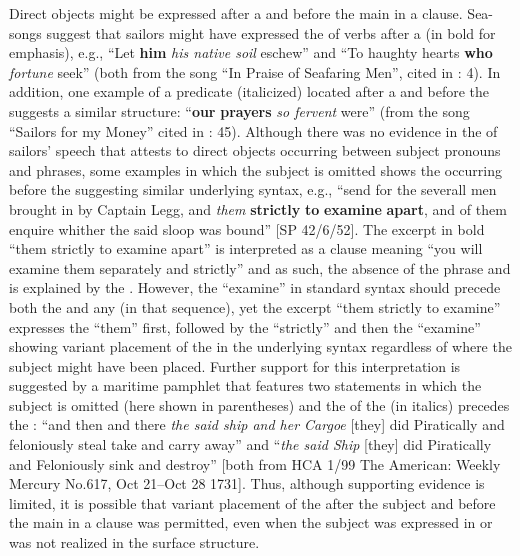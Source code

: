 Direct objects might be expressed after a  and before the main  in a clause. Sea-songs suggest that sailors might have expressed the  of  verbs after a  (in bold for emphasis), e.g., “Let \textbf{him} \textit{his native soil} eschew” and “To haughty hearts \textbf{who} \textit{fortune} seek” (both from the song “In Praise of Seafaring Men”, cited in \citealt{Palmer1986}: 4). In addition, one example of a predicate  (italicized) located after a  and before the  suggests a similar structure: “\textbf{our} \textbf{prayers} \textit{so fervent} were” (from the song “Sailors for my Money” cited in \citealt{Palmer1986}: 45). Although there was no evidence in the  of sailors’ speech that attests to direct objects occurring between subject pronouns and  phrases, some examples in which the subject is omitted shows the  occurring before the  suggesting similar underlying syntax, e.g., “send for the severall men brought in by Captain Legg, and \textit{them} \textbf{strictly} \textbf{to} \textbf{examine} \textbf{apart}, and of them enquire whither the said sloop was bound” [SP 42/6/52]. The excerpt in bold “them strictly to examine apart” is interpreted as a clause meaning “you will examine them separately and strictly” and as such, the absence of the  phrase and  is explained by the . However, the  “examine” in standard syntax should precede both the  and any  (in that sequence), yet the excerpt “them strictly to examine” expresses the  “them” first, followed by the  “strictly” and then the  “examine” showing variant placement of the  in the underlying syntax regardless of where the  subject might have been placed. Further support for this interpretation is suggested by a maritime pamphlet that features two statements in which the subject is omitted (here shown in parentheses) and the  of the  (in italics) precedes the : “and then and there \textit{the said ship and her Cargoe} [they] did Piratically and feloniously steal take and carry away” and “\textit{the said Ship} [they] did Piratically and Feloniously sink and destroy” [both from HCA 1/99 The American: Weekly Mercury No.617, Oct 21–Oct 28 1731]. Thus, although supporting evidence is limited, it is possible that variant placement of the  after the subject and before the main  in a clause was permitted, even when the subject was expressed in  or was not realized in the surface structure. 

